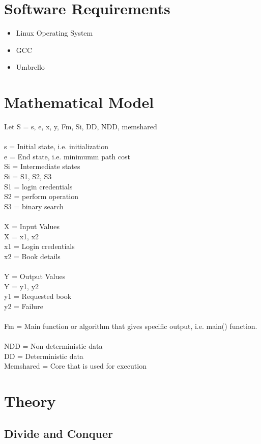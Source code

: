 \documentclass[a4paper,12pt]{article}
\begin{document}
\section{Software Requirements}
	\begin{itemize}
		\item	Linux Operating System
		\item	GCC
		\item	Umbrello
	\end{itemize}
	
\section{Mathematical Model}
	Let S = {s, e, x, y, Fm,  Si, DD, NDD, memshared}\\
	\\
	s = Initial state, i.e. initialization\\
	e = End state, i.e. minimumm path cost\\
	Si = Intermediate states\\
	Si = {S1, S2,  S3}\\
	S1 = login credentials\\
	S2 = perform operation\\
	S3 = binary search\\
	\\
	X = Input Values\\
	X = {x1, x2}\\
	x1 = Login credentials\\
	x2 = Book details\\
	\\
	Y = Output Values\\
	Y = {y1, y2}\\
	y1 = Requested book\\
	y2 = Failure\\
	\\
	Fm = Main function or algorithm that gives specific output, i.e. main() function.\\
	\\
	NDD = Non deterministic data\\ 
	DD = Deterministic data\\
	Memshared = Core that is used for execution\\
	
\section{Theory}
	\subsection{Divide and Conquer}
\end{document}
